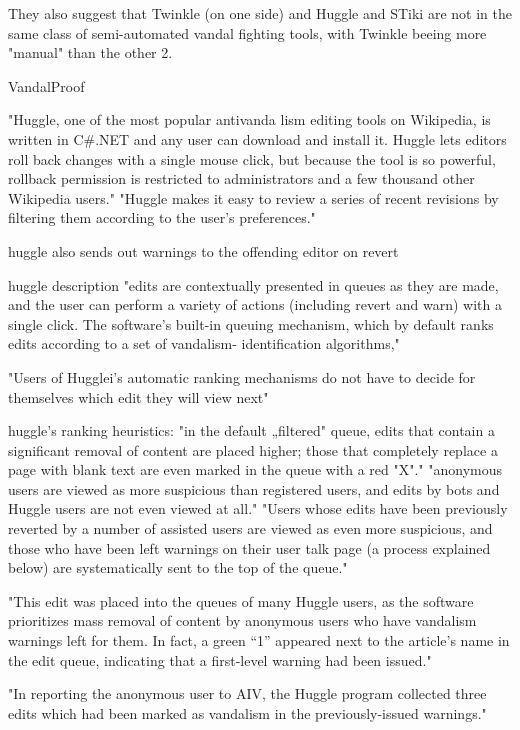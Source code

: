 They also suggest that Twinkle (on one side) and Huggle and STiki are not in the same class of semi-automated vandal fighting tools, with Twinkle beeing more "manual" than the other 2.

VandalProof~\cite{HalRied2012}

"Huggle, one of the most popular
antivanda lism editing tools on
Wikipedia, is written in C\#.NET
and any user can download and
install it. Huggle lets editors roll back
changes with a single mouse click,
but because the tool is so powerful,
rollback permission is restricted to
administrators and a few thousand
other Wikipedia users."
"Huggle makes it easy to review
a series of recent revisions by
filtering them according to the
user’s preferences."~\cite{HalRied2012}

huggle also sends out warnings to the offending editor on revert~\cite{HalRied2012}

\cite{GeiRib2010}
huggle description
"edits are contextually
presented in queues as they are made, and the user can
perform a variety of actions (including revert and warn) with
a single click. The software's built-in queuing mechanism,
which by default ranks edits according to a set of vandalism-
identification algorithms,"

"Users of Hugglei's automatic
ranking mechanisms do not have to decide for themselves
which edit they will view next"

huggle's ranking heuristics:
"in the default „filtered" queue, edits that contain a significant removal of content are placed
higher; those that completely replace a page with blank text
are even marked in the queue with a red "X"."
"anonymous users are viewed as more suspicious than
registered users, and edits by bots and Huggle users are not
even viewed at all."
"Users whose edits have been previously
reverted by a number of assisted users are viewed as even
more suspicious, and those who have been left warnings on
their user talk page (a process explained below) are
systematically sent to the top of the queue."

"This edit was placed into the queues of many
Huggle users, as the software prioritizes mass removal of
content by anonymous users who have vandalism warnings
left for them. In fact, a green “1” appeared next to the
article's name in the edit queue, indicating that a first-level
warning had been issued."

"In reporting the anonymous user to
AIV, the Huggle program collected three edits which had been
marked as vandalism in the previously-issued warnings."


